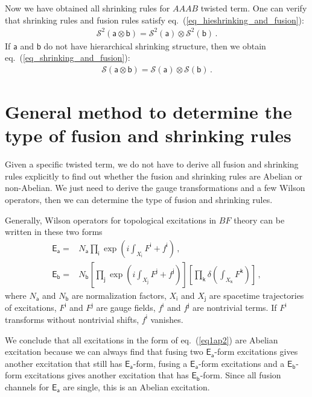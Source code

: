 \documentclass[11pt,nofootinbib,preprint]{revtex4-1}
\begin{document}
Now we have obtained all shrinking rules for $AAAB$ twisted term. One can verify that shrinking rules and fusion rules satisfy eq.~(\ref{eq_hieshrinking_and_fusion}):
\begin{align}
	\mathcal{S}^2 \left( \mathsf{a}\otimes \mathsf{b} \right) =\mathcal{S}^2 \left( \mathsf{a} \right) \otimes \mathcal{S}^2 \left( \mathsf{b} \right)\,.
\end{align}
If $\mathsf{a}$ and $\mathsf{b}$ do not have hierarchical shrinking structure, then we obtain eq.~(\ref{eq_shrinking_and_fusion}):
\begin{align}
	\mathcal{S} \left( \mathsf{a}\otimes \mathsf{b} \right) =\mathcal{S} \left( \mathsf{a} \right) \otimes \mathcal{S} \left( \mathsf{b} \right)\,.
\end{align}



\section{General method to determine the type of fusion and shrinking rules\label{ap2}}
Given a specific twisted term, we do not have to derive all fusion and shrinking rules explicitly to find out whether the fusion and shrinking rules are Abelian or non-Abelian. We just need to derive the gauge transformations and a few Wilson operators, then we can determine the type of fusion and shrinking rules.

Generally, Wilson operators for topological excitations in $BF$ theory can be written in these two forms 
\begin{align}
	\mathsf{E_a}=&N_{\mathsf{a}}\prod_{\mathsf{i}}{\exp \left( i\int_{X _{\mathsf{i}}}{F^{\mathsf{i}}+f^{\mathsf{i}}} \right)}\,, \label{eq1ap2}
	\\
	\mathsf{E_b}=&N_{\mathsf{b}}\left[ \prod_{\mathsf{j}}{\exp \left( i\int_{X _{\mathsf{j}}}{F^{\mathsf{j}}+f^{\mathsf{j}}} \right)} \right] \left[ \prod_{\mathsf{k}}{\delta \left( \int_{X _{\mathsf{k}}}{F^{\mathsf{k}}} \right)} \right] \,, \label{eq2ap2}
\end{align}
where $N_{\mathsf{a}}$ and $N_{\mathsf{b}}$ are normalization factors, $X _{\mathsf{i}}$ and $X _{\mathsf{j}}$ are spacetime trajectories of excitations, $F^{\mathsf{i}}$ and $F^{\mathsf{j}}$ are gauge fields, $f^{\mathsf{i}}$ and $f^{\mathsf{j}}$ are nontrivial terms. If $F^{\mathsf{i}}$ transforms without nontrivial shifts, $f^{\mathsf{i}}$ vanishes. 

We conclude that all excitations in the form of eq.~(\ref{eq1ap2}) are Abelian excitation because we can always find that fusing two $\mathsf{E_a}$-form excitations gives another excitation that still has $\mathsf{E_a}$-form, fusing a $\mathsf{E_a}$-form excitations and a $\mathsf{E_b}$-form excitations gives another excitation that has $\mathsf{E_b}$-form. Since all fusion channels for $\mathsf{E_a}$ are single, this is an Abelian excitation.
\end{document}
